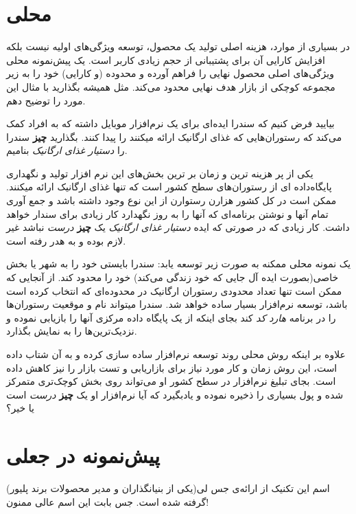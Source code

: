 \section{محلی}\label{ux645ux62dux644ux6cc}

در بسیاری از موارد، هزینه اصلی تولید یک محصول، توسعه ویژگی‌های اولیه
نیست بلکه افزایش کارایی آن برای پشتیبانی از حجم زیادی کاربر است. یک
پیش‌نمونه محلی ویژگی‌های اصلی محصول نهایی را فراهم آورده و محدوده (و
کارایی) خود را به زیر مجموعه کوچکی از بازار هدف نهایی محدود می‌کند. مثل
همیشه بگذارید با مثال این مورد را توضیح دهم.

بیایید فرض کنیم که سندرا ایده‌ای برای یک نرم‌افزار موبایل داشته که به
افراد کمک می‌کند که رستوران‌هایی که غذای ارگانیک ارائه میکنند را پیدا
کنند. بگذارید \textbf{چیز} سندرا را \emph{دستیار غذای ارگانیک} بنامیم.

یکی از پر هزینه ترین و زمان بر ترین بخش‌های این نرم افزار تولید و
نگهداری پایگاه‌داده ای از رستوران‌های سطح کشور است که تنها غذای ارگانیک
ارائه میکنند. ممکن است در کل کشور هزارن رستوارن از این نوع وجود داشته
باشد و جمع آوری تمام آنها و نوشتن برنامه‌ای که آنها را به روز نگهدارد
کار زیادی برای سندار خواهد داشت. کار زیادی که در صورتی که ایده
\emph{دستیار غذای ارگانیک} یک \textbf{چیز} \emph{درست} نباشد غیر لازم
بوده و به هدر رفته است.

یک نمونه محلی ممکنه به صورت زیر توسعه یابد: سندرا بایستی خود را به شهر
یا بخش خاصی(بصورت ایده آل جایی که خود زندگی می‌کند) خود را محدود کند. از
آنجایی که ممکن است تنها تعداد محدودی رستوران ارگانیک در محدوده‌ای که
انتخاب کرده است باشد، توسعه نرم‌افزار بسیار ساده خواهد شد. سندرا میتواند
نام و موقعیت رستوران‌ها را در برنامه \emph{هارد کد} کند بجای اینکه از یک
پایگاه داده مرکزی آنها را بازیابی نموده و نزدیک‌ترین‌ها را به نمایش
بگذارد.

علاوه بر اینکه روش محلی روند توسعه نرم‌افزار ساده سازی کرده و به آن شتاب
داده است، این روش زمان و کار مورد نیاز برای بازاریابی و تست بازار را نیز
کاهش داده است. بجای تبلیغ نرم‌افزار در سطح کشور او می‌تواند روی بخش
کوچک‌تری متمرکز شده و پول بسیاری را ذخیره نموده و یادبگیرد که آیا
نرم‌افزار او یک \textbf{چیز} \emph{درست} است یا خیر؟

\section{پیش‌نمونه در
جعلی}\label{ux67eux6ccux634ux646ux645ux648ux646ux647-ux62fux631-ux62cux639ux644ux6cc}

اسم این تکنیک از ارائه‌ی جس لی(یکی از بنیانگذاران و مدیر محصولات برند
پلیور) گرفته شده است. جس بابت این اسم عالی ممنون!

